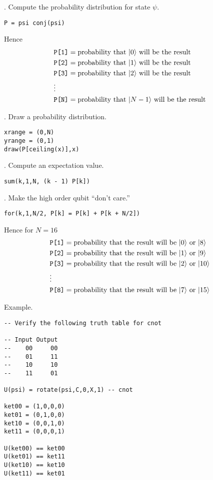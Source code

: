 . Compute the probability distribution for state $\psi$.
{\color{blue}
\begin{verbatim}
P = psi conj(psi)
\end{verbatim}}

\noindent
Hence
\begin{align*}
&\text{\tt P[1]}=\text{probability that $|0\rangle$ will be the result}
\\
&\text{\tt P[2]}=\text{probability that $|1\rangle$ will be the result}
\\
&\text{\tt P[3]}=\text{probability that $|2\rangle$ will be the result}
\\
&\vdots
\\
&\text{\tt P[N]}=\text{probability that $|N-1\rangle$ will be the result}
\end{align*}

. Draw a probability distribution.
{\color{blue}
\begin{verbatim}
xrange = (0,N)
yrange = (0,1)
draw(P[ceiling(x)],x)
\end{verbatim}}

. Compute an expectation value.
{\color{blue}
\begin{verbatim}
sum(k,1,N, (k - 1) P[k])
\end{verbatim}}

. Make the high order qubit ``don't care.''
{\color{blue}
\begin{verbatim}
for(k,1,N/2, P[k] = P[k] + P[k + N/2])
\end{verbatim}}

\noindent
Hence for $N=16$
\begin{align*}
&\text{\tt P[1]}=\text{probability that the result will be $|0\rangle$ or $|8\rangle$}
\\
&\text{\tt P[2]}=\text{probability that the result will be $|1\rangle$ or $|9\rangle$}
\\
&\text{\tt P[3]}=\text{probability that the result will be $|2\rangle$ or $|10\rangle$}
\\
&\vdots
\\
&\text{\tt P[8]}=\text{probability that the result will be $|7\rangle$ or $|15\rangle$}
\end{align*}

\noindent
Example.
{\color{blue}
\begin{verbatim}
-- Verify the following truth table for cnot

-- Input Output
--    00     00
--    01     11
--    10     10
--    11     01

U(psi) = rotate(psi,C,0,X,1) -- cnot

ket00 = (1,0,0,0)
ket01 = (0,1,0,0)
ket10 = (0,0,1,0)
ket11 = (0,0,0,1)

U(ket00) == ket00
U(ket01) == ket11
U(ket10) == ket10
U(ket11) == ket01
\end{verbatim}}
